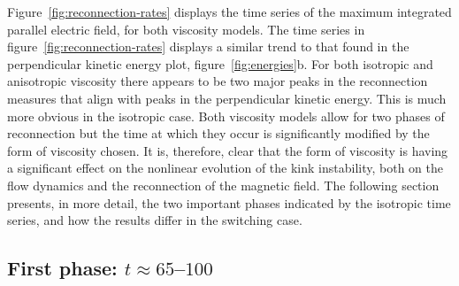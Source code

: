 Figure~\ref{fig:reconnection-rates} displays the time series of the maximum integrated parallel electric field, for both viscosity models. The time series in figure~\ref{fig:reconnection-rates} displays a similar trend to that found in the perpendicular kinetic energy plot, figure~\ref{fig:energies}b. For both isotropic and anisotropic viscosity there appears to be two major peaks in the reconnection measures that align with peaks in the perpendicular kinetic energy. This is much more obvious in the isotropic case. Both viscosity models allow for two phases of reconnection but the time at which they occur is significantly modified by the form of viscosity chosen. It is, therefore, clear that the form of viscosity is having a significant effect on the nonlinear evolution of the kink instability, both on the flow dynamics and the reconnection of the magnetic field. The following section presents, in more detail, the two important phases indicated by the isotropic time series, and how the results differ in the switching case.

\subsection{First phase: $t\approx65$--$100$}

